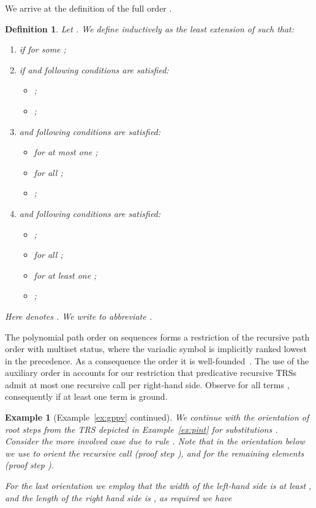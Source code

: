 \documentclass{LMCS}
\newtheorem{example}[thm]{Example}
\newtheorem{definition}[thm]{Definition}
\begin{document}
\noindent We arrive at the definition of the full order .
\begin{definition}\label{d:gpopv} 
  Let .
  We define  inductively as the least extension of  such that:
  \begin{enumerate}[labelsep=*,leftmargin=*]
  \item\label{d:gpopv:st}
     if  for some ;
  \item\label{d:gpopv:ep}
     if  
    and following conditions are satisfied: 
    \begin{itemize}
    \item ;
    \item ;
    \end{itemize}
  \item\label{d:gpopv:ialst} 
     
    and following conditions are satisfied: 
    \begin{itemize}
    \item  for at most one ;
    \item  for all ;
    \item ;
    \end{itemize}
  \item\label{d:gpopv:ms} 
    
    and following conditions are satisfied: 
    \begin{itemize}
    \item ;
    \item  for all ; \item  for at least one ; \item ;
    \end{itemize}
  \end{enumerate}
  Here  denotes . 
  We write  to abbreviate .
\end{definition}

The polynomial path order on sequences forms a restriction of the recursive path order with 
multiset status, where the variadic symbol  is implicitly 
ranked lowest in the precedence. As a consequence the order
it is well-founded~\cite{Ferreira95}.
The use of the auxiliary order in  accounts 
for our restriction that predicative recursive TRSs admit at most one 
recursive call per right-hand side.
Observe  for all terms , 
consequently   if at least one term  is ground.

\begin{example}[Example~\ref{ex:gppv} continued]\label{ex:gpopv} 
  We continue with the orientation of root steps from
  the TRS  depicted in Example~\ref{ex:pint}
  for substitutions .
Consider the more involved case  due to rule .
Note that in the orientation below we
  use  to orient the recursive call (proof step ), 
  and  for the remaining elements (proof step ).
  
  For the last orientation we employ that the width of the left-hand side 
  is at least , and the length of the right hand side is 
  , as required we have 
  
\end{example}
\end{document}
